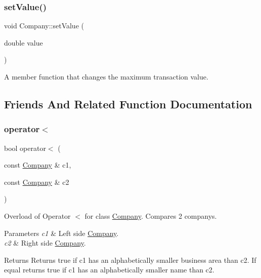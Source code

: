 \subsubsection{\texorpdfstring{set\+Value()}{setValue()}}
{\footnotesize\ttfamily void Company\+::set\+Value (\begin{DoxyParamCaption}\item[{double}]{value }\end{DoxyParamCaption})}

A member function that changes the maximum transaction value. 

\subsection{Friends And Related Function Documentation}
\mbox{\label{class_company_ad929126732815ca48c4a724b0f8c61f0}} 
\subsubsection{\texorpdfstring{operator$<$}{operator<}}
{\footnotesize\ttfamily bool operator$<$ (\begin{DoxyParamCaption}\item[{const \hyperlink{class_company}{Company} \&}]{c1,  }\item[{const \hyperlink{class_company}{Company} \&}]{c2 }\end{DoxyParamCaption})\hspace{0.3cm}{\ttfamily [friend]}}

Overload of Operator $<$ for class \hyperlink{class_company}{Company}. Compares 2 company\textquotesingle{}s. 
\begin{DoxyParams}{Parameters}
{\em c1} & Left side \hyperlink{class_company}{Company}. \\
\hline
{\em c2} & Right side \hyperlink{class_company}{Company}. \\
\hline
\end{DoxyParams}
\begin{DoxyReturn}{Returns}
Returns true if c1 has an alphabetically smaller business area than c2. If equal returns true if c1 has an alphabetically smaller name than c2. 
\end{DoxyReturn}
\mbox{\label{class_company_a8df46a57b8a540b441aa9ee118fe2cc4}} 
